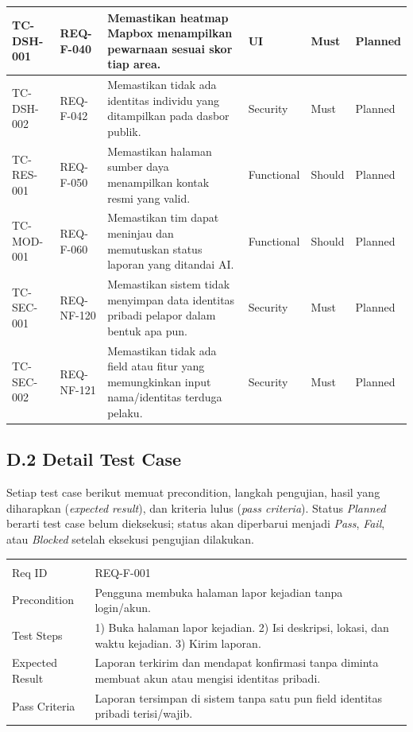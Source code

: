\documentclass[11pt,a4paper]{article}
\begin{document}
\begin{longtable}{|L{2.0cm}|L{1.8cm}|L{5.8cm}|L{1.7cm}|L{1.4cm}|L{1.3cm}|}
TC-DSH-001 & REQ-F-040 & Memastikan heatmap Mapbox menampilkan pewarnaan sesuai skor tiap area. & UI & Must & Planned \\ \hline
TC-DSH-002 & REQ-F-042 & Memastikan tidak ada identitas individu yang ditampilkan pada dasbor publik. & Security & Must & Planned \\ \hline
TC-RES-001 & REQ-F-050 & Memastikan halaman sumber daya menampilkan kontak resmi yang valid. & Functional & Should & Planned \\ \hline
TC-MOD-001 & REQ-F-060 & Memastikan tim dapat meninjau dan memutuskan status laporan yang ditandai AI. & Functional & Should & Planned \\ \hline
TC-SEC-001 & REQ-NF-120 & Memastikan sistem tidak menyimpan data identitas pribadi pelapor dalam bentuk apa pun. & Security & Must & Planned \\ \hline
TC-SEC-002 & REQ-NF-121 & Memastikan tidak ada field atau fitur yang memungkinkan input nama/identitas terduga pelaku. & Security & Must & Planned \\ \hline
\end{longtable}
\normalsize

\newpage

\subsection*{D.2 Detail Test Case}
Setiap test case berikut memuat precondition, langkah pengujian, hasil yang diharapkan (\textit{expected result}), dan kriteria lulus (\textit{pass criteria}). Status \textit{Planned} berarti test case belum dieksekusi; status akan diperbarui menjadi \textit{Pass}, \textit{Fail}, atau \textit{Blocked} setelah eksekusi pengujian dilakukan.

\footnotesize

\begin{longtable}{|L{2.6cm}|L{11.4cm}|}
\hline
{} \\ \hline
\endfirsthead
\hline
{} \\ \hline
\endhead
Req ID & REQ-F-001 \\ \hline
Precondition & Pengguna membuka halaman lapor kejadian tanpa login/akun. \\ \hline
Test Steps & 1) Buka halaman lapor kejadian. 2) Isi deskripsi, lokasi, dan waktu kejadian. 3) Kirim laporan. \\ \hline
Expected Result & Laporan terkirim dan mendapat konfirmasi tanpa diminta membuat akun atau mengisi identitas pribadi. \\ \hline
Pass Criteria & Laporan tersimpan di sistem tanpa satu pun field identitas pribadi terisi/wajib. \\ \hline
\end{longtable}
\end{document}
